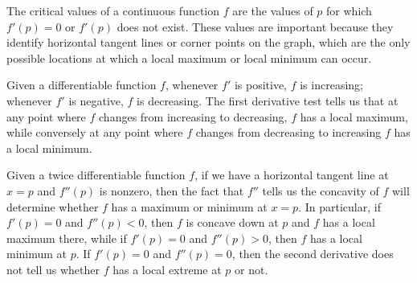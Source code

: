 \begin{summary}
\item The critical values of a continuous function $f$ are the values of $p$ for which $f'(p) = 0$ or $f'(p)$ does not exist.  These values are important because they identify horizontal tangent lines or corner points on the graph, which are the only possible locations at which a local maximum or local minimum can occur.
\item Given a differentiable function $f$, whenever $f'$ is positive, $f$ is increasing; whenever $f'$ is negative, $f$ is decreasing.  The first derivative test tells us that at any point where $f$ changes from increasing to decreasing, $f$ has a local maximum, while conversely at any point where $f$ changes from decreasing to increasing $f$ has a local minimum.
\item Given a twice differentiable function $f$, if we have a horizontal tangent line at $x = p$ and $f''(p)$ is nonzero, then the fact that $f''$ tells us the concavity of $f$ will determine whether $f$ has a maximum or minimum at $x = p$.  In particular, if $f'(p) = 0$ and $f''(p) < 0$, then $f$ is concave down at $p$ and $f$ has a local maximum there, while if $f'(p) = 0$ and $f''(p) > 0$, then $f$ has a local minimum at $p$.  If $f'(p) = 0$ and $f''(p) = 0$, then the second derivative does not tell us whether $f$ has a local extreme at $p$ or not.
\end{summary}

\nin \hrulefill

 

\clearpage

